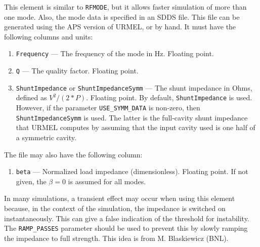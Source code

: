 This element is similar to {\tt RFMODE}, but it allows faster simulation of more than
one mode.  Also, the mode data is specified in an SDDS file.  This file can be
generated using the APS version of URMEL, or by hand. It must have the following
columns and units:
\begin{enumerate}
\item {\tt Frequency} --- The frequency of the mode in Hz.  Floating point.
\item {\tt Q} --- The quality factor.  Floating point.
\item {\tt ShuntImpedance} or {\tt ShuntImpedanceSymm} --- The shunt
  impedance in Ohms, defined as $V^2/(2*P)$.   Floating point. By default, {\tt ShuntImpedance} is
  used.  However, if the parameter \verb|USE_SYMM_DATA| is non-zero, then 
  {\tt ShuntImpedanceSymm}  is used.  The latter is the full-cavity 
  shunt impedance that URMEL computes
  by assuming that the input cavity used is one half of a symmetric cavity.
\end{enumerate}

The file may also have the following column:
\begin{enumerate}
\item {\tt beta} --- Normalized load impedance (dimensionless).   Floating point.  If not given, the
 $\beta=0$ is assumed for all modes.
\end{enumerate}

In many simulations, a transient effect may occur when using this
element because, in the context of the simulation, the impedance is
switched on instantaneously.  This can give a false indication of the
threshold for instability. The {\tt RAMP\_PASSES} parameter should
be used to prevent this by slowly ramping the impedance to full
strength.  This idea is from M. Blaskiewicz (BNL).
